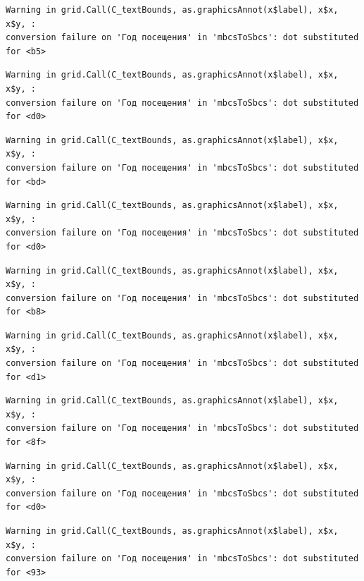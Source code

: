 \documentclass[
  letterpaper,
  DIV=11,
  numbers=noendperiod]{scrartcl}
\begin{document}
\begin{verbatim}
Warning in grid.Call(C_textBounds, as.graphicsAnnot(x$label), x$x, x$y, :
conversion failure on 'Год посещения' in 'mbcsToSbcs': dot substituted for <b5>
\end{verbatim}

\begin{verbatim}
Warning in grid.Call(C_textBounds, as.graphicsAnnot(x$label), x$x, x$y, :
conversion failure on 'Год посещения' in 'mbcsToSbcs': dot substituted for <d0>
\end{verbatim}

\begin{verbatim}
Warning in grid.Call(C_textBounds, as.graphicsAnnot(x$label), x$x, x$y, :
conversion failure on 'Год посещения' in 'mbcsToSbcs': dot substituted for <bd>
\end{verbatim}

\begin{verbatim}
Warning in grid.Call(C_textBounds, as.graphicsAnnot(x$label), x$x, x$y, :
conversion failure on 'Год посещения' in 'mbcsToSbcs': dot substituted for <d0>
\end{verbatim}

\begin{verbatim}
Warning in grid.Call(C_textBounds, as.graphicsAnnot(x$label), x$x, x$y, :
conversion failure on 'Год посещения' in 'mbcsToSbcs': dot substituted for <b8>
\end{verbatim}

\begin{verbatim}
Warning in grid.Call(C_textBounds, as.graphicsAnnot(x$label), x$x, x$y, :
conversion failure on 'Год посещения' in 'mbcsToSbcs': dot substituted for <d1>
\end{verbatim}

\begin{verbatim}
Warning in grid.Call(C_textBounds, as.graphicsAnnot(x$label), x$x, x$y, :
conversion failure on 'Год посещения' in 'mbcsToSbcs': dot substituted for <8f>
\end{verbatim}

\begin{verbatim}
Warning in grid.Call(C_textBounds, as.graphicsAnnot(x$label), x$x, x$y, :
conversion failure on 'Год посещения' in 'mbcsToSbcs': dot substituted for <d0>
\end{verbatim}

\begin{verbatim}
Warning in grid.Call(C_textBounds, as.graphicsAnnot(x$label), x$x, x$y, :
conversion failure on 'Год посещения' in 'mbcsToSbcs': dot substituted for <93>
\end{verbatim}
\end{document}
